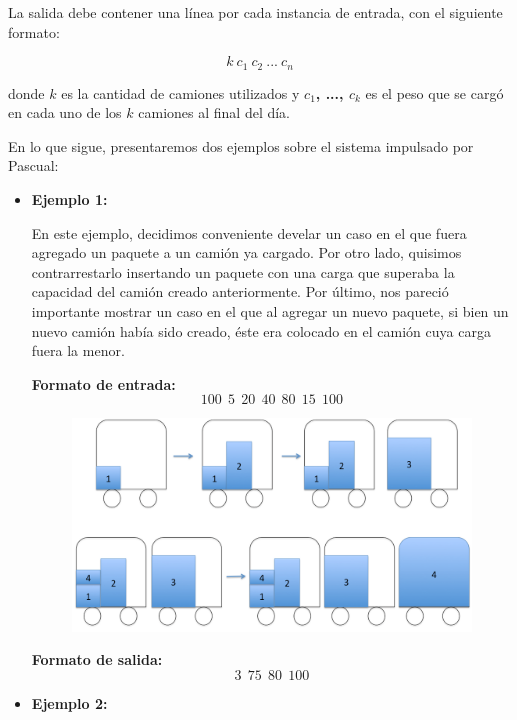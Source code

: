 La salida debe contener una línea por cada instancia de entrada, con el siguiente formato:

$$k\ c_{1}\ c_{2}\ ...\ c_{n}$$


donde \textbf{$k$} es la cantidad de camiones utilizados y \textbf{$c_{1}$, ..., $c_{k}$} es el peso que se cargó en cada uno de los \textbf{$k$} camiones al final del día.\newline

En lo que sigue, presentaremos dos ejemplos sobre el sistema impulsado por Pascual:
\begin{itemize}
\item {\large{\textbf{Ejemplo 1:}}}\newline

En este ejemplo, decidimos conveniente develar un caso en el que fuera agregado un paquete a un camión ya cargado. Por otro lado, quisimos contrarrestarlo insertando un paquete con una carga que superaba la capacidad del camión creado anteriormente. Por último, nos pareció importante mostrar un caso en el que al agregar un nuevo paquete, si bien un nuevo camión había sido creado, éste era colocado en el camión cuya carga fuera la menor.\newline

\textbf{Formato de entrada:}
$$100\ \ 5\ \ 20\ \ 40\ \ 80\ \ 15\ \ 100$$

\begin{figure}[H] %
\begin{center}
\includegraphics[width=320pt]{../imgs/ejemplo1.jpg}
\end{center}
\end{figure}

\textbf{Formato de salida:}
$$3\ \ 75\ \ 80\ \ 100$$


\item {\large{\textbf{Ejemplo 2:}}}\newline


\end{itemize}
